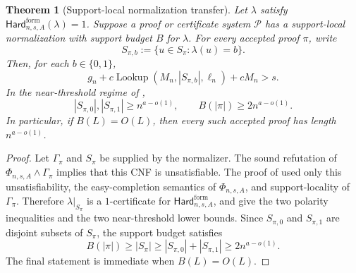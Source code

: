 \documentclass[11pt]{article}
\newtheorem{theorem}{Theorem}[section]
\theoremstyle{definition}
\newcommand{\bits}{\{0,1\}}
\newcommand{\Lookup}{\operatorname{Lookup}}
\newcommand{\HardF}{\mathsf{Hard}^{\mathrm{form}}}
\begin{document}
\begin{theorem}[Support-local normalization transfer]\label{thm:support-local-normalization-transfer}
Let \(\lambda\) satisfy \(\HardF_{n,s,A}(\lambda)=1\).  Suppose a proof or certificate system \(\mathcal P\) has a support-local normalization with support budget \(B\) for \(\lambda\).  For every accepted proof \(\pi\), write
\[
  S_{\pi,b}:=\{u\in S_\pi:\lambda(u)=b\}.
\]
Then, for each \(b\in\bits\),
\[
  g_n+c\Lookup(M_n,|S_{\pi,b}|,\ell_n)+cM_n>s.
\]
In the near-threshold regime of ,
\[
  |S_{\pi,0}|,|S_{\pi,1}|\ge n^{a-o(1)},
  \qquad
  B(|\pi|)\ge 2n^{a-o(1)}.
\]
In particular, if \(B(L)=O(L)\), then every such accepted proof has length \(n^{a-o(1)}\).
\end{theorem}

\begin{proof}
Let \(\Gamma_\pi\) and \(S_\pi\) be supplied by the normalizer.  The sound refutation of \(\Phi_{n,s,A}\wedge\Gamma_\pi\) implies that this CNF is unsatisfiable.  The proof of  used only this unsatisfiability, the easy-completion semantics of \(\Phi_{n,s,A}\), and support-locality of \(\Gamma_\pi\).  Therefore \(\lambda|_{S_\pi}\) is a \(1\)-certificate for \(\HardF_{n,s,A}\), and  give the two polarity inequalities and the two near-threshold lower bounds.  Since \(S_{\pi,0}\) and \(S_{\pi,1}\) are disjoint subsets of \(S_\pi\), the support budget satisfies
\[
  B(|\pi|)\ge |S_\pi|\ge |S_{\pi,0}|+|S_{\pi,1}|\ge 2n^{a-o(1)}.
\]
The final statement is immediate when \(B(L)=O(L)\).
\end{proof}
\end{document}
